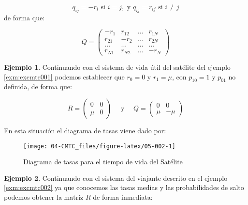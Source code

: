 \documentclass[
]{book}
\theoremstyle{definition}
\theoremstyle{definition}
\newtheorem{example}{Ejemplo}[chapter]
\theoremstyle{definition}
\theoremstyle{definition}
\theoremstyle{remark}
\begin{document}
\[q_{ij} = -r_i \text{ si } i = j, \text{ y } q_{ij} = r_{ij} \text{ si } i \neq j\]
de forma que:

\[Q = 
\begin{pmatrix}
-r_1 & r_{12} & ... & r_{1N}\\
r_{21} & -r_2 & ... & r_{2N}\\
... & ... & ... & ...\\
r_{N1} & r_{N2} & ... & -r_N
\end{pmatrix}\]

\begin{example}
\protect\hypertarget{exm:excmtc003}{}\label{exm:excmtc003}Continuando con el sistema de vida útil del satélite del ejemplo \ref{exm:excmtc001} podemos establecer que \(r_0 = 0\) y \(r_1 = \mu\), con \(p_{10} = 1\) y \(p_{01}\) no definida, de forma que:
\end{example}

\[R = 
\begin{pmatrix}
0 & 0 \\
\mu & 0
\end{pmatrix} \quad \text{ y } \quad Q = 
\begin{pmatrix}
0 & 0 \\
\mu & -\mu
\end{pmatrix}\]

En esta situación el diagrama de tasas viene dado por:

\begin{figure}

{\centering \texttt{[image: 04-CMTC\_files/figure-latex/05-002-1]} 

}

\caption{Diagrama de tasas para el tiempo de vida del Satélite}\label{fig:05-002}
\end{figure}

\begin{example}
\protect\hypertarget{exm:excmtc004}{}\label{exm:excmtc004}Continuando con el sistema del viajante descrito en el ejemplo \ref{exm:excmtc002} ya que conocemos las tasas medias y las probabilidades de salto podemos obtener la matriz \(R\) de forma inmediata:
\end{example}
\end{document}
